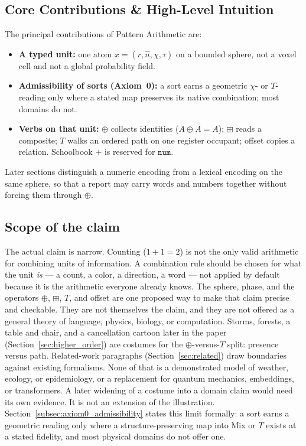 \documentclass[12pt, a4paper]{article}
\begin{document}
\subsection{Core Contributions \& High-Level Intuition}
The principal contributions of Pattern Arithmetic are:
\begin{itemize}
    \item \textbf{A typed unit:} one atom $x=(r,\hat n,\chi,\tau)$ on a bounded sphere, not a voxel cell and not a global probability field.
    \item \textbf{Admissibility of sorts (Axiom~0):} a sort earns a geometric $\chi$- or $T$-reading only where a stated map preserves its native combination; most domains do not.
    \item \textbf{Verbs on that unit:} $\oplus$ collects identities ($A\oplus A=A$); $\boxplus$ reads a composite; $T$ walks an ordered path on one register occupant; offset copies a relation. Schoolbook $+$ is reserved for $\mathtt{num}$.
\end{itemize}

Later sections distinguish a numeric encoding from a lexical encoding on the same sphere, so that a report may carry words and numbers together without forcing them through $\oplus$.

\subsection{Scope of the claim}
\label{subsec:claim_scope}
The actual claim is narrow. Counting ($1+1=2$) is not the only valid
arithmetic for combining units of information. A combination rule
should be chosen for what the unit \emph{is} --- a count, a color, a
direction, a word --- not applied by default because it is the
arithmetic everyone already knows. The sphere, phase, and the
operators $\oplus$, $\boxplus$, $T$, and offset are one proposed way
to make that claim precise and checkable. They are not themselves the
claim, and they are not offered as a general theory of language,
physics, biology, or computation.
Storms, forests, a table and chair, and a cancellation cartoon later in the paper
(Section~\ref{sec:higher_order}) are costumes for the
$\oplus$-versus-$T$ split: presence versus path. Related-work
paragraphs (Section~\ref{sec:related}) draw boundaries against
existing formalisms. None of that is a demonstrated model of weather,
ecology, or epidemiology, or a replacement for quantum mechanics,
embeddings, or transformers. A later widening of a costume into a
domain claim would need its own evidence. It is not an extension of
the illustration.
Section~\ref{subsec:axiom0_admissibility} states this limit formally:
a sort earns a geometric reading only where a structure-preserving
map into Mix or $T$ exists at a stated fidelity, and most physical
domains do not offer one.
\end{document}
